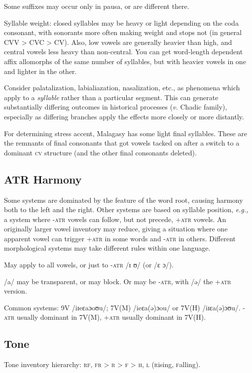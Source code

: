 \documentclass[11pt]{article}
\newcommand{\I}[1]{\textsc{#1}}   %
\begin{document}
Some suffixes may occur only in pausa, or are different there.

Syllable weight: closed syllables may be heavy or light depending on
the coda consonant, with sonorants more often making weight and stops
not (in general CVV > CVC > CV).  Also, low vowels are generally
heavier than high, and central vowels less heavy than non-central. You
can get word-length dependent affix allomorphs of the same number of
syllables, but with heavier vowels in one and lighter in the other.

Consider palatalization, labialiazation, nasalization, etc., as
phenomena which apply to a \textit{syllable} rather than a particular
segment. This can generate substantially differing outcomes in
historical processes (\textit{v.} Chadic family), especially as
differing branches apply the effects more closely or more distantly. 

For determining stress accent, Malagasy has some light final
syllables. These are the remnants of final consonants that got vowels
tacked on after a switch to a dominant \I{cv} structure (and the other
final consonants deleted).

\subsection{ATR Harmony}
Some systems are dominated by the feature of the word root, causing
harmony both to the left and the right. Other systems are based on
syllable position, \textit{e.g.,} a system where \I{-atr} vowels can
follow, but not precede, \I{+atr} vowels. An originally larger vowel
inventory may reduce, giving a situation where one apparent vowel can
trigger \I{+atr} in some words and \I{-atr} in others. Different
morphological systems may take different rules within one language.

May apply to all vowels, or just to \I{-atr} /ɪ ʊ/ (or /ɛ ɔ/).

/a/ may be transparent, or may block. Or may be \I{-atr}, with /ə/ the
\I{+atr} version.

Common systems: 9V /iɪeɛaɔoʊu/; 7V(M) /ieɛa(ə)ɔou/ or 7V(H)
/iɪɛa(ə)ɔʊu/. \I{-atr} usually dominant in 7V(M), \I{+atr} usually
dominant in 7V(H).

\subsection{Tone}
Tone inventory hierarchy: \I{rf, fr > r > f > h, l} (\I{r}ising,
\I{f}alling).
\end{document}

